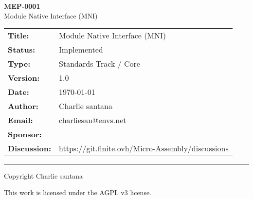 \documentclass[11pt]{article}
\makeatletter
\newcommand{\proposalType}{MEP}
\newcommand{\proposalNumber}{0001}
\newcommand{\proposalTitle}{Module Native Interface (MNI)}
\newcommand{\proposalStatus}{Implemented}
\newcommand{\proposalVersion}{1.0}
\newcommand{\proposalDate}{\today}
\newcommand{\proposalAuthor}{Charlie santana}
\newcommand{\proposalAuthorsEmail}{charliesan@envs.net}
\newcommand{\proposalSponsor}{}
\newcommand{\proposalDiscussion}{https://git.finite.ovh/Micro-Assembly/discussions}
\makeatother
\begin{document}
	
	\begin{titlepage}
		\centering
		
		\vspace*{2cm}
		
		{\Huge\bfseries \proposalType-\proposalNumber\\}
		\vspace{0.5cm}
		{\LARGE \proposalTitle}
		
		\vspace{2cm}
		
		\begin{tabular}{ll}
			\textbf{Title:} & \proposalTitle \\
			\textbf{Status:} & \proposalStatus \\
			\textbf{Type:} & Standards Track / Core  \\
			\textbf{Version:} & \proposalVersion \\
			\textbf{Date:} & \proposalDate \\
			\textbf{Author:} & \proposalAuthor \\
			\textbf{Email:} & \proposalAuthorsEmail \\
			\textbf{Sponsor:} & \proposalSponsor \\
			\textbf{Discussion:} & \proposalDiscussion \\
		\end{tabular}
		
		\vfill
		
		\begin{abstract}
			The Module Native Interface (MNI) provides an abstraction layer for invoking native host-language functions from Micro-Assembly (MASM) programs.  
			Through MNI, MASM developers can extend the runtime’s capabilities without modifying its core — enabling access to features such as file I/O, threading, networking, and user interface operations.
			
		\end{abstract}
		
		\vspace{1cm}
		
		\rule{\textwidth}{0.4pt}
		
		\vspace{0.5cm}
		
		\small
		Copyright \textcopyright{} \the\year{} \proposalAuthor
		
		This work is licensed under the AGPL v3 license.
		
	\end{titlepage}
	
\end{document}
